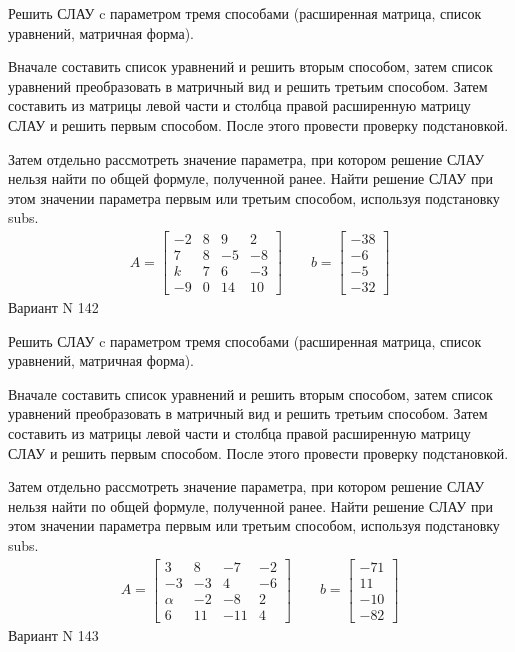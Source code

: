 \documentclass[11pt]{report}
\begin{document}
Решить СЛАУ c параметром тремя способами (расширенная матрица, список уравнений, матричная форма).

Вначале составить список уравнений и решить вторым способом,
затем список уравнений преобразовать в матричный вид и решить третьим способом.
Затем составить из матрицы левой части и столбца правой расширенную матрицу СЛАУ и решить первым способом.
После этого провести проверку подстановкой.

Затем отдельно рассмотреть значение параметра, при котором решение СЛАУ нельзя найти по общей формуле,
полученной ранее.
Найти решение СЛАУ при этом значении параметра первым или третьим способом, используя подстановку subs.
\begin{align*}
    A = \left[\begin{matrix}-2 & 8 & 9 & 2\\7 & 8 & -5 & -8\\k & 7 & 6 & -3\\-9 & 0 & 14 & 10\end{matrix}\right]
\qquad b = \left[\begin{matrix}-38\\-6\\-5\\-32\end{matrix}\right]
\end{align*}
\newpage
Вариант N 142


Решить СЛАУ c параметром тремя способами (расширенная матрица, список уравнений, матричная форма).

Вначале составить список уравнений и решить вторым способом,
затем список уравнений преобразовать в матричный вид и решить третьим способом.
Затем составить из матрицы левой части и столбца правой расширенную матрицу СЛАУ и решить первым способом.
После этого провести проверку подстановкой.

Затем отдельно рассмотреть значение параметра, при котором решение СЛАУ нельзя найти по общей формуле,
полученной ранее.
Найти решение СЛАУ при этом значении параметра первым или третьим способом, используя подстановку subs.
\begin{align*}
    A = \left[\begin{matrix}3 & 8 & -7 & -2\\-3 & -3 & 4 & -6\\\alpha & -2 & -8 & 2\\6 & 11 & -11 & 4\end{matrix}\right]
\qquad b = \left[\begin{matrix}-71\\11\\-10\\-82\end{matrix}\right]
\end{align*}
\newpage
Вариант N 143
\end{document}
